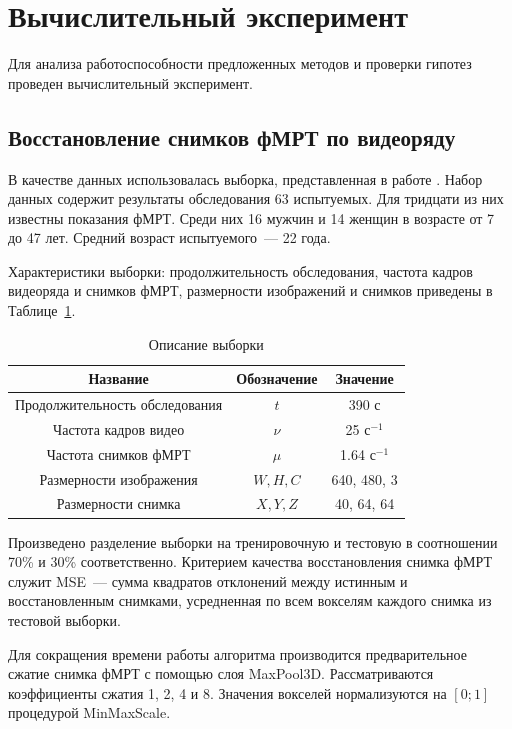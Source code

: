 \section{Вычислительный эксперимент}\label{sec3}
Для анализа работоспособности предложенных методов и проверки гипотез
проведен вычислительный эксперимент.
\subsection{Восстановление снимков фМРТ по видеоряду}
В качестве данных использовалась выборка, представленная в работе \citep{Berezutskaya2022}.
Набор данных содержит результаты обследования 63 испытуемых.
Для тридцати из них известны показания фМРТ.
Среди них 16 мужчин и 14 женщин в возрасте от 7 до 47 лет.
Средний возраст испытуемого~--- 22 года.

Характеристики выборки: продолжительность обследования,
частота кадров видеоряда и снимков фМРТ, размерности изображений
и снимков приведены в Таблице~\ref{table:sample}.

\begin{table}[h!]
	\centering
	\caption{Описание выборки}
	\begin{tabular}{|c|c|c|}
		\hline
		Название                       & Обозначение & Значение             \\
		\hline \hline
		Продолжительность обследования & $t$         & 390 с                \\ \hline
		Частота кадров видео           & $\nu$       & 25 $\text{с}^{-1}$   \\ \hline
		Частота снимков фМРТ           & $\mu$       & 1.64 $\text{с}^{-1}$ \\ \hline
		Размерности изображения        & $W, H, C$   & 640, 480, 3          \\ \hline
		Размерности снимка             & $X, Y, Z$   & 40, 64, 64           \\ \hline
	\end{tabular}
	\label{table:sample}
\end{table}

Произведено разделение выборки на тренировочную и тестовую в соотношении 70\% и 30\% соответственно.
Критерием качества восстановления снимка фМРТ служит MSE~--- сумма квадратов отклонений
между истинным и восстановленным снимками, усредненная по всем вокселям каждого снимка
из тестовой выборки.

Для сокращения времени работы алгоритма производится предварительное сжатие снимка фМРТ
с помощью слоя MaxPool3D. Рассматриваются коэффициенты сжатия 1, 2, 4 и 8.
Значения вокселей нормализуются на $[0; 1]$ процедурой MinMaxScale.

